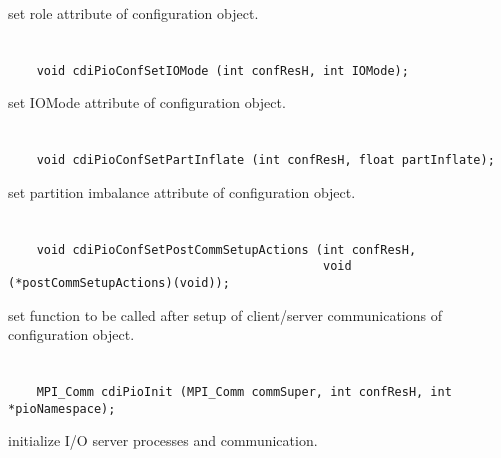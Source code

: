 set role attribute of configuration object.


\section*{\tt {}}

\begin{verbatim}
    void cdiPioConfSetIOMode (int confResH, int IOMode);
\end{verbatim}

set IOMode attribute of configuration object.


\section*{\tt {}}

\begin{verbatim}
    void cdiPioConfSetPartInflate (int confResH, float partInflate);
\end{verbatim}

set partition imbalance attribute of
configuration object.


\section*{\tt {}}

\begin{verbatim}
    void cdiPioConfSetPostCommSetupActions (int confResH,
                                            void (*postCommSetupActions)(void));
\end{verbatim}

set function to be called after
setup of client/server communications of configuration object.


\section*{\tt {}}

\begin{verbatim}
    MPI_Comm cdiPioInit (MPI_Comm commSuper, int confResH, int *pioNamespace);
\end{verbatim}

initialize I/O server processes and communication.


\section*{\tt {}}


